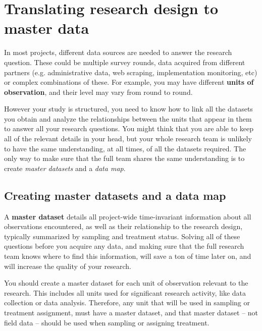 
\section{Translating research design to master data}

In most projects, different data sources are needed to answer the research question.
These could be multiple survey rounds,
data acquired from different  partners (e.g. administrative data,
web scraping, implementation monitoring, etc)
or complex combinations of these.
For example, you may have different \textbf{units of observation},
and their level may vary from round to round.

However your study is structured, you need to know how to link all the datasets you obtain
and analyze the relationships between the units that appear in them
to answer all your research questions.
You might think that you are able to keep all of the relevant details in your head,
but your whole research team is unlikely to have the same understanding,
at all times, of all the datasets required.
The only way to make sure that the full team shares the same understanding
is to create \textit{master datasets} and a \textit{data map}.


\subsection{Creating master datasets and a data map}

A \textbf{master dataset}
details all project-wide time-invariant information
about all observations encountered,
as well as their relationship to the research design,
typically summarized by sampling and treatment status.
Solving all of these questions before you acquire any data,
and making sure that the full research team knows where to find this information,
will save a ton of time later on,
and will increase the quality of your research.

You should create a master dataset
for each unit of observation
relevant to the research.
This includes all units used for significant research activity,
like data collection or data analysis.
Therefore, any unit
that will be used in sampling or treatment assignment,
must have a master dataset,
and that master dataset -- not field data --
should be used when sampling or assigning treatment.

